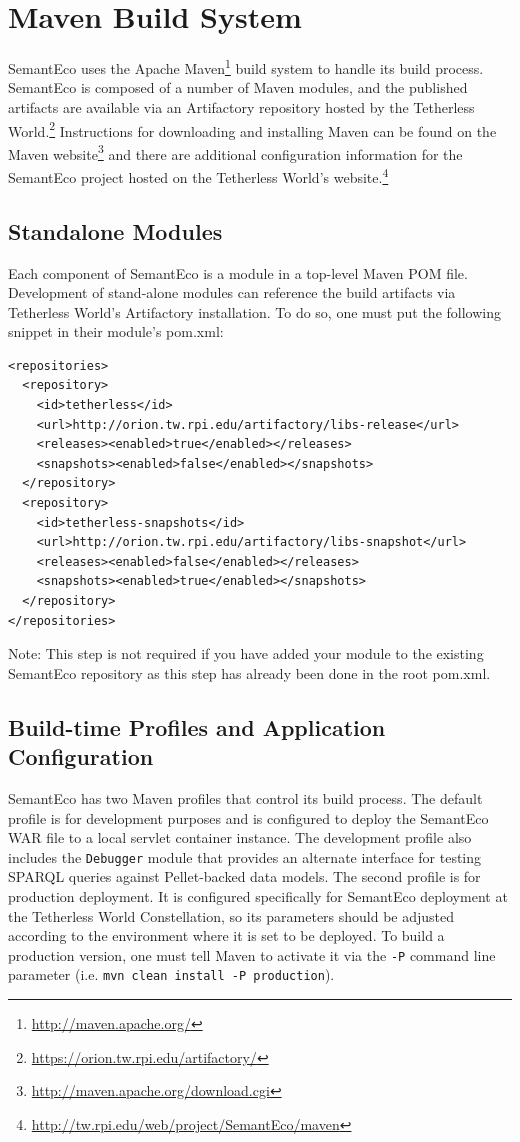 \documentclass[letterpaper]{report}
\begin{document}
\appendix
\chapter{Maven Build System}
\label{maven-build-system}
SemantEco uses the Apache Maven\footnote{\url{http://maven.apache.org/}} build system to handle its build process. SemantEco is composed of a number of Maven modules, and the published artifacts are available via an Artifactory repository hosted by the Tetherless World.\footnote{\url{https://orion.tw.rpi.edu/artifactory/}} Instructions for downloading and installing Maven can be found on the Maven website\footnote{\url{http://maven.apache.org/download.cgi}} and there are additional configuration information for the SemantEco project hosted on the Tetherless World's website.\footnote{\url{http://tw.rpi.edu/web/project/SemantEco/maven}}

\section{Standalone Modules}
Each component of SemantEco is a module in a top-level Maven POM file. Development of stand-alone modules can reference the build artifacts via Tetherless World's Artifactory installation. To do so, one must put the following snippet in their module's pom.xml:

\begin{lstlisting}
<repositories>
  <repository>
    <id>tetherless</id>
    <url>http://orion.tw.rpi.edu/artifactory/libs-release</url>
    <releases><enabled>true</enabled></releases>
    <snapshots><enabled>false</enabled></snapshots>
  </repository>
  <repository>
    <id>tetherless-snapshots</id>
    <url>http://orion.tw.rpi.edu/artifactory/libs-snapshot</url>
    <releases><enabled>false</enabled></releases>
    <snapshots><enabled>true</enabled></snapshots>
  </repository>
</repositories>
\end{lstlisting}

\noindent Note: This step is not required if you have added your module to the existing SemantEco repository as this step has already been done in the root pom.xml.

\section{Build-time Profiles and Application Configuration}
SemantEco has two Maven profiles that control its build process. The default profile is for development purposes and is configured to deploy the SemantEco WAR file to a local servlet container instance. The development profile also includes the \texttt{Debugger} module that provides an alternate interface for testing SPARQL queries against Pellet-backed data models. The second profile is for production deployment. It is configured specifically for SemantEco deployment at the Tetherless World Constellation, so its parameters should be adjusted according to the environment where it is set to be deployed. To build a production version, one must tell Maven to activate it via the \texttt{-P} command line parameter (i.e. \texttt{mvn clean install -P production}).
\end{document}
